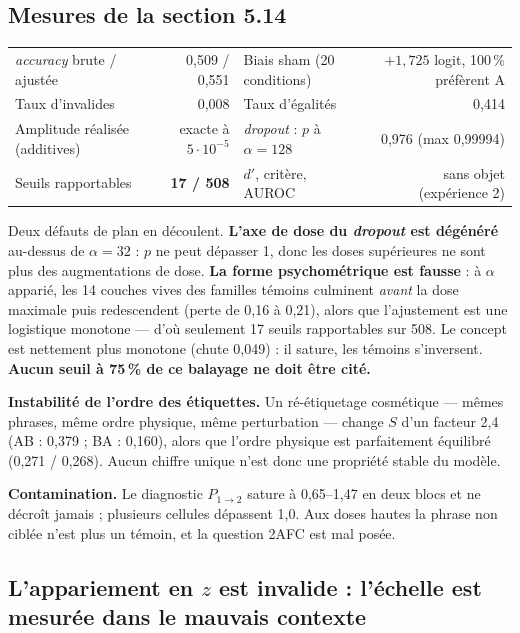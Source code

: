 \documentclass[a4paper,10pt]{article}
\newcommand{\pc}[1]{#1\,\%}
\begin{document}
\subsection{Mesures de la section 5.14}

\begin{center}\small
\begin{tabular}{lr@{\qquad}lr}
\toprule
\emph{accuracy} brute / ajustée & 0,509 / 0,551 & Biais sham (20 conditions) & $+1{,}725$ logit, \pc{100} préfèrent A \\
Taux d'invalides & 0,008 & Taux d'égalités & 0,414 \\
Amplitude réalisée (additives) & exacte à $5\cdot10^{-5}$ & \emph{dropout} : $p$ à $\alpha=128$ & 0,976 (max 0,99994) \\
Seuils rapportables & \textbf{17 / 508} & $d'$, critère, AUROC & sans objet (expérience 2) \\
\bottomrule
\end{tabular}
\end{center}

Deux défauts de plan en découlent. \textbf{L'axe de dose du \emph{dropout} est dégénéré} au-dessus de
$\alpha = 32$ : $p$ ne peut dépasser 1, donc les doses supérieures ne sont plus des augmentations de
dose. \textbf{La forme psychométrique est fausse} : à $\alpha$ apparié, les 14 couches vives des
familles témoins culminent \emph{avant} la dose maximale puis redescendent (perte de 0,16 à 0,21),
alors que l'ajustement est une logistique monotone --- d'où seulement 17 seuils rapportables sur 508.
Le concept est nettement plus monotone (chute 0,049) : il sature, les témoins s'inversent.
\textbf{Aucun seuil à \pc{75} de ce balayage ne doit être cité.}

\textbf{Instabilité de l'ordre des étiquettes.} Un ré-étiquetage cosmétique --- mêmes phrases, même
ordre physique, même perturbation --- change $S$ d'un facteur 2,4 (AB : 0,379 ; BA : 0,160), alors
que l'ordre physique est parfaitement équilibré (0,271 / 0,268). Aucun chiffre unique n'est donc une
propriété stable du modèle.

\textbf{Contamination.} Le diagnostic $P_{1\rightarrow2}$ sature à 0,65--1,47 en deux blocs et ne
décroît jamais ; plusieurs cellules dépassent 1,0. Aux doses hautes la phrase non ciblée n'est plus
un témoin, et la question 2AFC est mal posée.

\subsection{L'appariement en $z$ est invalide : l'échelle est mesurée dans le mauvais contexte}
\end{document}
